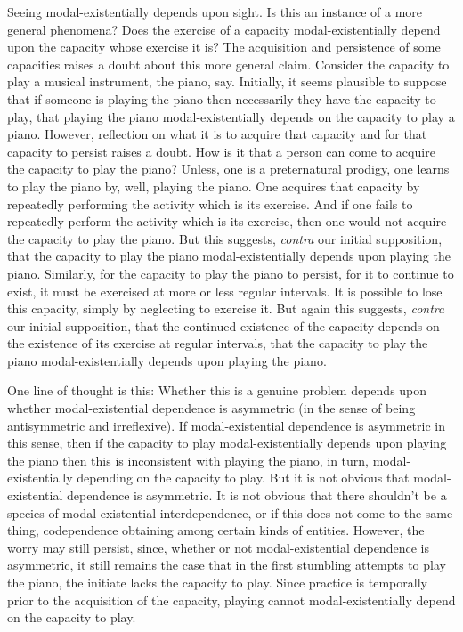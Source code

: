 \documentclass[12pt]{article}
\begin{document}
Seeing modal-existentially depends upon sight. Is this an instance of a more general phenomena? Does the exercise of a capacity modal-existentially depend upon the capacity whose exercise it is? The acquisition and persistence of some capacities raises a doubt about this more general claim. Consider the capacity to play a musical instrument, the piano, say. Initially, it seems plausible to suppose that if someone is playing the piano then necessarily they have the capacity to play, that playing the piano modal-existentially depends on the capacity to play a piano. However, reflection on what it is to acquire that capacity and for that capacity to persist raises a doubt. How is it that a person can come to acquire the capacity to play the piano? Unless, one is a preternatural prodigy, one learns to play the piano by, well, playing the piano. One acquires that capacity by repeatedly performing the activity which is its exercise. And if one fails to repeatedly perform the activity which is its exercise, then one would not acquire the capacity to play the piano. But this suggests, \emph{contra} our initial supposition, that the capacity to play the piano modal-existentially depends upon playing the piano. Similarly, for the capacity to play the piano to persist, for it to continue to exist, it must be exercised at more or less regular intervals. It is possible to lose this capacity, simply by neglecting to exercise it. But again this suggests, \emph{contra} our initial supposition, that the continued existence of the capacity depends on the existence of its exercise at regular intervals, that the capacity to play the piano modal-existentially depends upon playing the piano.

One line of thought is this: Whether this is a genuine problem depends upon whether modal-existential dependence is asymmetric (in the sense of being antisymmetric and irreflexive). If modal-existential dependence is asymmetric in this sense, then if the capacity to play modal-existentially depends upon playing the piano then this is inconsistent with playing the piano, in turn, modal-existentially depending on the capacity to play. But it is not obvious that modal-existential dependence is asymmetric. It is not obvious that there shouldn't be a species of modal-existential interdependence, or if this does not come to the same thing, codependence obtaining among certain kinds of entities. However, the worry may still persist, since, whether or not modal-existential dependence is asymmetric, it still remains the case that in the first stumbling attempts to play the piano, the initiate lacks the capacity to play. Since practice is temporally prior to the acquisition of the capacity, playing cannot modal-existentially depend on the capacity to play. 
\end{document}
